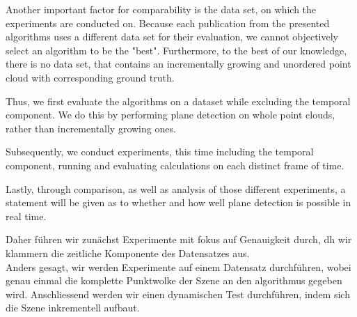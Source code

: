 \documentclass[main.tex]{subfiles}
\begin{document}

Another important factor for comparability is the data set, on which the experiments are conducted on.
Because each publication from the presented algorithms uses a different data set for their evaluation, we cannot objectively select an algorithm to be the "best".
Furthermore, to the best of our knowledge, there is no data set, that contains an incrementally growing and unordered point cloud with corresponding ground truth.

Thus, we first evaluate the algorithms on a dataset while excluding the temporal component. We do this by performing plane detection on whole point clouds, rather than
incrementally growing ones.

Subsequently, we conduct experiments, this time including the temporal component, running and evaluating calculations on each distinct frame of time.

Lastly, through comparison, as well as analysis of those different experiments, a statement will be given as to whether and how well plane detection is possible in real time.

Daher führen wir zunächst Experimente mit fokus auf Genauigkeit durch, dh wir klammern die zeitliche Komponente des Datensatzes aus. \\
Anders gesagt, wir werden Experimente auf einem Datensatz durchführen, wobei genau einmal die komplette Punktwolke der Szene an den algorithmus gegeben wird.
Anschliessend werden wir einen dynamischen Test durchführen, indem sich die Szene inkrementell aufbaut.\\
\end{document}
